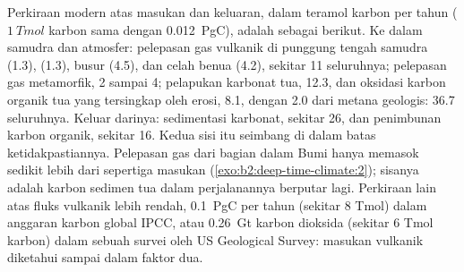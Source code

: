 Perkiraan modern atas masukan dan keluaran, dalam teramol karbon per tahun ($\qty{1}{Tmol}$
karbon sama dengan \qty{0.012}{PgC}), adalah sebagai berikut. Ke dalam samudra dan atmosfer: pelepasan gas vulkanik di
punggung tengah samudra (1.3),  (1.3), busur (4.5), dan celah benua (4.2), sekitar 11
seluruhnya; pelepasan gas metamorfik, 2 sampai 4; pelapukan karbonat tua, 12.3, dan oksidasi
karbon organik tua yang tersingkap oleh erosi, 8.1, dengan 2.0 dari metana geologis: \num{36.7} seluruhnya.
Keluar darinya: sedimentasi karbonat, sekitar 26, dan penimbunan karbon organik, sekitar 16. Kedua
sisi itu seimbang di dalam batas ketidakpastiannya. Pelepasan gas dari bagian dalam Bumi hanya memasok sedikit lebih dari
sepertiga masukan (\cref{exo:b2:deep-time-climate:2}); sisanya adalah karbon sedimen tua dalam
perjalanannya berputar lagi. Perkiraan lain atas fluks vulkanik lebih rendah, \qty{0.1}{PgC} per tahun
(sekitar 8 Tmol) dalam anggaran karbon global IPCC, atau \qty{0.26}{Gt} karbon dioksida (sekitar 6
Tmol karbon) dalam sebuah survei oleh US Geological Survey: masukan vulkanik diketahui sampai dalam
faktor dua.

